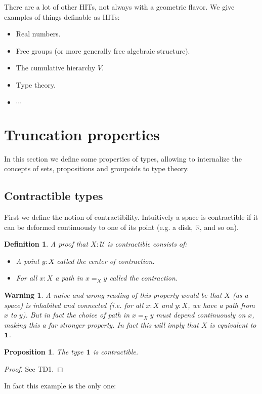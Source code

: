 \documentclass{article}
\newcommand{\se}[1]{\medbreak \medbreak \section{#1}}
\newcommand{\sse}[1]{\medbreak \subsection{#1}}
\newcommand{\U}{{\mathcal U}}
\newcommand{\one}{{\bf 1}}
\newtheorem{definition}{Definition}
\newtheorem{proposition}{Proposition}
\newtheorem{warning}{\danger Warning}
\begin{document}
There are a lot of other HITs, not always with a geometric flavor. We give examples of things definable as HITs:
\begin{itemize} 
\item Real numbers.
\item Free groups (or more generally free algebraic structure).
\item The cumulative hierarchy $V$.
\item Type theory.
\item $\cdots$
\end{itemize}




\se{Truncation properties}

In this section we define some properties of types, allowing to internalize the concepts of sets, propositions and groupoids to type theory.


\sse{Contractible types}

First we define the notion of contractibility. Intuitively a space is contractible if it can be deformed continuously to one of its point (e.g. a disk, $\mathbb{R}$, and so on). %

\begin{definition}
A proof that $X:\U$ is contractible consists of:
\begin{itemize}
\item A point $y:X$ called the \emph{center of contraction}.
\item For all $x:X$ a path in $x=_X y$ called the \emph{contraction}.
\end{itemize}
\end{definition}

\begin{warning}
A naive and wrong reading of this property would be that $X$ (as a space) is inhabited and connected (i.e. for all $x:X$ and $y:X$, we have a path from $x$ to $y$). But in fact the choice of path in $x=_X y$ must depend continuously on $x$, making this a far stronger property. In fact this will imply that $X$ is equivalent to $\one$.
\end{warning}

\begin{proposition}
The type $\one$ is contractible.
\end{proposition}
\begin{proof}
See TD1.
\end{proof}

In fact this example is the only one:
\end{document}
